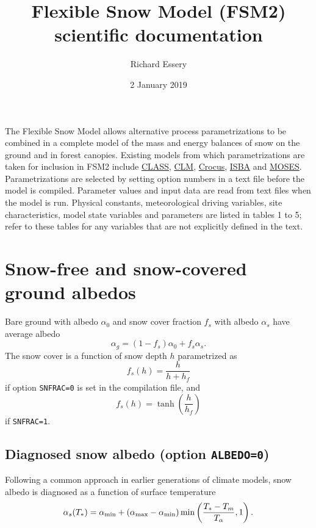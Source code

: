 \documentclass{article}
\title{Flexible Snow Model (FSM2) scientific documentation}
\author{Richard Essery}
\date{2 January 2019}
\begin{document}
\maketitle

The Flexible Snow Model allows alternative process parametrizations to be combined in a complete model of the mass and energy balances of snow on the ground and in forest canopies. Existing models from which parametrizations are taken for inclusion in FSM2 include
\href{https://www.tandfonline.com/doi/abs/10.3137/ao.440301}{CLASS},
\href{http://www.cesm.ucar.edu/models/cesm1.2/clm/CLM45_Tech_Note.pdf}{CLM},
\href{https://www.geosci-model-dev.net/5/773/2012/}{Crocus}, 
\href{https://www.umr-cnrm.fr/IMG/pdf/snowdoc_v2.pdf}{ISBA} and 
\href{https://link.springer.com/article/10.1007/s003820050276}{MOSES}.
Parametrizations are selected by setting option numbers in a text file before the model is compiled. Parameter values and input data are read from text files when the model is run. Physical constants, meteorological driving variables, site characteristics, model state variables and parameters are listed in tables 1 to 5; refer to these tables for any variables that are not explicitly defined in the text.

\section{Snow-free and snow-covered ground albedos}

Bare ground with albedo $\alpha_0$ and snow cover fraction $f_s$ with albedo $\alpha_s$ have average albedo
\begin{equation}
\alpha_g = (1 - f_s)\alpha_0 +f_s\alpha_s.
\end{equation} 
The snow cover is a function of snow depth $h$ parametrized as
\begin{equation}
f_s(h) = \frac{h}{h + h_f}
\end{equation}
if option {\tt SNFRAC=0} is set in the compilation file, and
\begin{equation}
f_s(h) = \tanh\left(\frac{h}{h_f}\right)
\end{equation}
if {\tt SNFRAC=1}.

\subsection{Diagnosed snow albedo (option {\tt ALBEDO=0})}

Following a common approach in earlier generations of climate models, snow albedo is diagnosed as a function of surface temperature 
\begin{equation}
\alpha_s(T_*) = \alpha_{\rm min} + (\alpha_{\rm max} - \alpha_{\rm min})
                \min\left(\frac{T_* - T_m}{T_\alpha}, 1\right).        
\end{equation}
\end{document}
